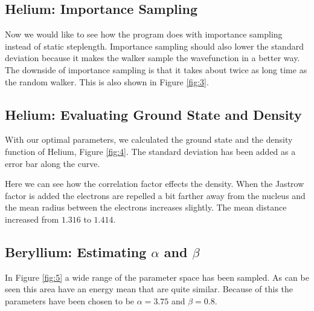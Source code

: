 \documentclass[twocolumn]{article}[10pt]
\begin{document}
\subsection{Helium: Importance Sampling}
Now we would like to see how the program does with importance sampling instead 
of static steplength. Importance sampling should also lower the standard 
deviation because it makes the walker sample the wavefunction in a
better way. The downside of importance sampling is that it takes about
twice as long time as the random walker. This is also shown in Figure \ref{fig:3}. 


\subsection{Helium: Evaluating Ground State and Density}
With our optimal parameters, we calculated the ground state and the density
function of Helium, Figure \ref{fig:4}. The standard deviation has been added as
a error bar along the curve.

Here we can see how the correlation factor effects the density. When
the Jastrow factor is added the electrons are repelled a bit farther 
away from the nucleus and the mean radius between the electrons increases
slightly. The mean distance increased from $1.316$ to $1.414$. 

\subsection{Beryllium: Estimating $\alpha$ and $\beta$}
In Figure \ref{fig:5} a wide range of the parameter space has been sampled. As can be seen this area have an energy mean that are quite similar. Because of this
the parameters have been chosen to be $\alpha =  3.75$ and $\beta = 0.8$. 
\end{document}
